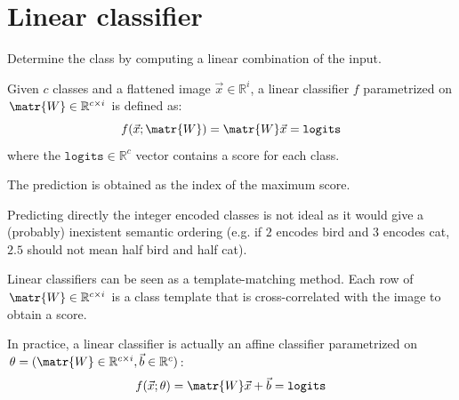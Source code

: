 \section{Linear classifier}

Determine the class by computing a linear combination of the input.

Given $c$ classes and a flattened image $\vec{x} \in \mathbb{R}^{i}$, a linear classifier $f$ parametrized on $\matr{W} \in \mathbb{R}^{c \times i}$ is defined as:
\[ f(\vec{x}; \matr{W}) = \matr{W}\vec{x} = \texttt{logits} \]
where the $\texttt{logits} \in \mathbb{R}^{c}$ vector contains a score for each class.

The prediction is obtained as the index of the maximum score.

\begin{remark}
    Predicting directly the integer encoded classes is not ideal as it would give a (probably) inexistent semantic ordering
    (e.g. if $2$ encodes bird and $3$ encodes cat, $2.5$ should not mean half bird and half cat).
\end{remark}

\begin{remark}
    Linear classifiers can be seen as a template-matching method.
    Each row of $\matr{W} \in \mathbb{R}^{c \times i}$ is a class template that is cross-correlated with the image to obtain a score.
\end{remark}

\begin{remark}
    In practice, a linear classifier is actually an affine classifier parametrized on $\theta = (\matr{W} \in \mathbb{R}^{c \times i}, \vec{b} \in \mathbb{R}^{c})$:
    \[ f(\vec{x}; \theta) = \matr{W}\vec{x} + \vec{b} = \texttt{logits} \]
\end{remark}




